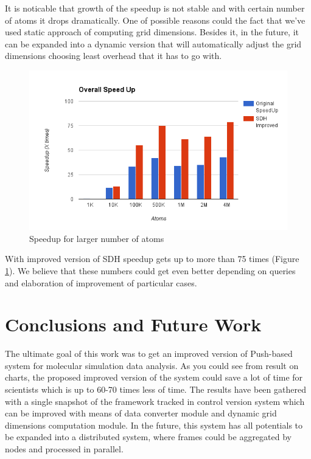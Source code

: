 \documentclass[12pt,letterpaper]{report}
\begin{document}
\hspace{3em} It is noticable that growth of the speedup is not stable and with certain number of atoms it drops dramatically. One of possible reasons could the fact that we've used static approach of computing grid dimensions. Besides it, in the future, it can be expanded into a dynamic version that will automatically adjust the grid dimensions choosing least overhead that it has to go with.

\begin{figure}
 \centerline{\includegraphics[width=0.8\columnwidth]{images/overall_speedup}}
 \caption{Speedup for larger number of atoms}
 \label{fg:chart_max}
\end{figure}

With improved version of SDH speedup gets up to more than 75 times (Figure \ref{fg:chart_max}). We believe that these numbers could get even better depending on queries and elaboration of improvement of particular cases.

\chapter{Conclusions and Future Work}\label{sc:conclusion}
\hspace{3em} The ultimate goal of this work was to get an improved version of Push-based system for molecular simulation data analysis. As you could see from result on charts, the proposed improved version of the system could save a lot of time for scientists which is up to 60-70 times less of time. The results have been gathered with a single snapshot of the framework tracked in control version system which can be improved with means of data converter module and dynamic grid dimensions computation module. In the future, this system has all potentials to be expanded into a distributed system, where frames could be aggregated by nodes and processed in parallel.\\

\linespread{1}\selectfont


\end{document}
